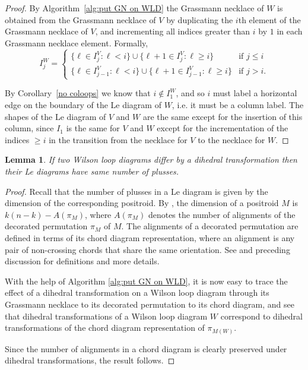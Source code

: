 \documentclass[11pt]{article}
\newtheorem{lem}[thm]{Lemma}
\theoremstyle{remark}
\theoremstyle{definition}
\begin{document}
\begin{proof}
  By Algorithm~\ref{alg:put GN on WLD} the Grassmann necklace of $W$ is obtained from the Grassmann necklace of $V$ by duplicating the $i$th element of the Grassmann necklace of $V$, and incrementing all indices greater than $i$ by $1$ in each Grassmann necklace element.  Formally, 
  \[
  I_j^{W} =
  \begin{cases}
    \{\ell \in I_j^{V} : \ell < i\} \cup \{\ell+1 \in I_j^{V} : \ell \geq i\} & \text{if $j\leq i$} \\
    \{\ell \in I_{j-1}^{V} : \ell < i\} \cup \{\ell+1 \in I_{j-1}^{V} : \ell \geq i\} & \text{if $j > i$.}
  \end{cases}
  \]


By Corollary~\ref{no coloops} we know that $i \not\in I_1^W$, and so $i$ must label a horizontal edge on the boundary of the Le diagram of $W$, i.e. it must be a column label. The shapes of the Le diagram of $V$ and $W$ are the same except for the insertion of this column, since $I_1$ is the same for $V$ and $W$ except for the incrementation of the indices $\geq i$ in the transition from the necklace for $V$ to the necklace for $W$. 
\end{proof}
\vspace{0.5em}

\begin{lem}\label{lem dihedral}
If two Wilson loop diagrams differ by a dihedral transformation then their Le diagrams have same number of plusses.
\end{lem}
\begin{proof}
Recall that the number of plusses in a Le diagram is given by the dimension of the corresponding positroid. By \cite[Proposition 17.10]{Postnikov}, the dimension of a positroid $M$ is $k(n-k) - A(\pi_M)$, where $A(\pi_M)$ denotes the number of alignments of the decorated permutation $\pi_M$ of $M$. The alignments of a decorated permutation are defined in terms of its chord diagram representation, where an alignment is any pair of non-crossing chords that share the same orientation. See \cite[Figure 17.1]{Postnikov} and preceding discussion for definitions and more details.

With the help of Algorithm \ref{alg:put GN on WLD}, it is now easy to trace the effect of a dihedral transformation on a Wilson loop diagram through its Grassmann necklace to its decorated permutation to its chord diagram, and see that dihedral transformations of a Wilson loop diagram $W$ correspond to dihedral transformations of the chord diagram representation of $\pi_{M(W)}$. 

Since the number of alignments in a chord diagram is clearly preserved under dihedral transformations, the result follows.
\end{proof}
\end{document}
